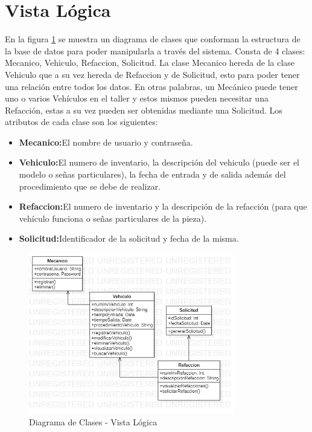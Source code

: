 \section{Vista Lógica}
En la figura \ref{fig:Diagrama de Clases - Vista Logica} se muestra un diagrama de clases que conforman la estructura de la base de datos para poder manipularla a través del sistema. Consta de 4 clases: Mecanico, Vehiculo, Refaccion, Solicitud. La clase Mecanico hereda de la clase Vehiculo que a su vez hereda de Refaccion y de Solicitud, esto para poder tener una relación entre todos los datos. En otras palabras, un Mecánico puede tener uno o varios Vehículos en el taller y estos mismos pueden necesitar una Refacción, estas a su vez pueden ser obtenidas mediante una Solicitud. 
Los atributos de cada clase son los siguientes: 
\begin{itemize}
	\item \textbf{Mecanico:}El nombre de usuario y contraseña.
	\item \textbf{Vehiculo:}El numero de inventario, la descripción del vehiculo (puede ser el modelo o señas particulares), la fecha de entrada y de salida además del procedimiento que se debe de realizar.
	\item \textbf{Refaccion:}El numero de inventario y la descripción de la refacción (para que vehículo funciona o señas particulares de la pieza).
	\item \textbf{Solicitud:}Identificador de la solicitud y fecha de la misma.
\end{itemize}
\begin{figure}[!h]
	\centering
	\includegraphics[width=0.8\textwidth]{./diseno/vlogica/imagenes/vistaLogica}
	\caption{Diagrama de Clases - Vista Lógica}
	\label{fig:Diagrama de Clases - Vista Logica}
\end{figure}
\clearpage